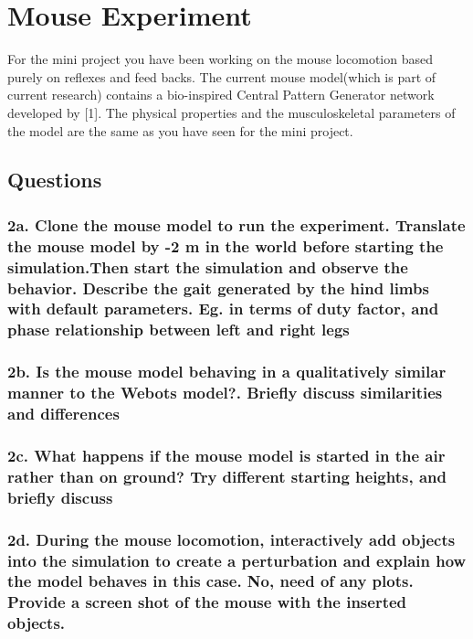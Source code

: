 \documentclass{cmc}
\begin{document}
{        \newpage

        \section*{Mouse Experiment}
      
        \label{sec:mouse-experiment}

        For the mini project you have been working on the mouse
        locomotion based purely on reflexes and feed backs.  The
        current mouse model(which is part of current research)
        contains a bio-inspired Central Pattern Generator network
        developed by [1]. The physical properties and the
        musculoskeletal parameters of the model are the same as you
        have seen for the mini project.

        \subsection*{Questions}

        \subsubsection*{2a. Clone the mouse model to run the
          experiment. Translate the mouse model by -2 m in the world
          before starting the simulation.Then start the simulation and
          observe the behavior. Describe the gait generated by the
          hind limbs with default parameters. Eg. in terms of duty
          factor, and phase relationship between left and right legs}

        \subsubsection*{2b. Is the mouse model behaving in a
          qualitatively similar manner to the Webots model?. Briefly
          discuss similarities and differences}

        \subsubsection*{2c. What happens if the mouse model is started
          in the air rather than on ground? Try different starting
          heights, and briefly discuss}

        \subsubsection*{2d. During the mouse locomotion, interactively
          add objects into the simulation to create a perturbation and
          explain how the model behaves in this case. No, need of any
          plots. Provide a screen shot of the mouse with the inserted
          objects.}

}
\end{document}
